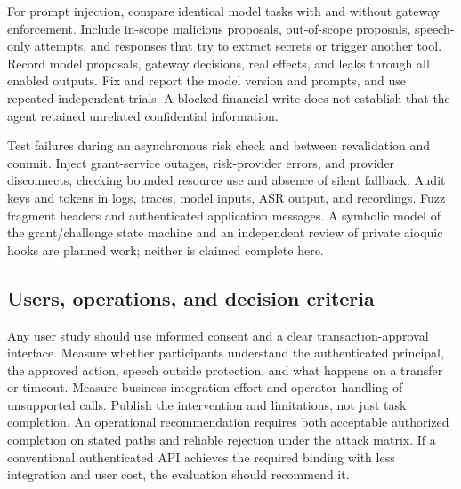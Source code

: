 For prompt injection, compare identical model tasks with and without gateway
enforcement. Include in-scope malicious proposals, out-of-scope proposals,
speech-only attempts, and responses that try to extract secrets or trigger
another tool. Record model proposals, gateway decisions, real effects, and
leaks through all enabled outputs. Fix and report the model version and prompts,
and use repeated independent trials. A blocked financial write does not
establish that the agent retained unrelated confidential information.

Test failures during an asynchronous risk check and between revalidation and
commit. Inject grant-service outages, risk-provider errors, and provider
disconnects, checking bounded resource use and absence of silent fallback.
Audit keys and tokens in logs, traces, model inputs, ASR output, and recordings.
Fuzz fragment headers and authenticated application messages. A symbolic model
of the grant/challenge state machine and an independent review of private
aioquic hooks are planned work; neither is claimed complete here.

\subsection{Users, operations, and decision criteria}
Any user study should use informed consent and a clear transaction-approval
interface. Measure whether participants understand the authenticated principal,
the approved action, speech outside protection, and what happens on a transfer
or timeout. Measure business integration effort and operator handling of
unsupported calls. Publish the intervention and limitations, not just task
completion. An operational recommendation requires both acceptable authorized
completion on stated paths and reliable rejection under the attack matrix.
If a conventional authenticated API achieves the required binding with less
integration and user cost, the evaluation should recommend it.
